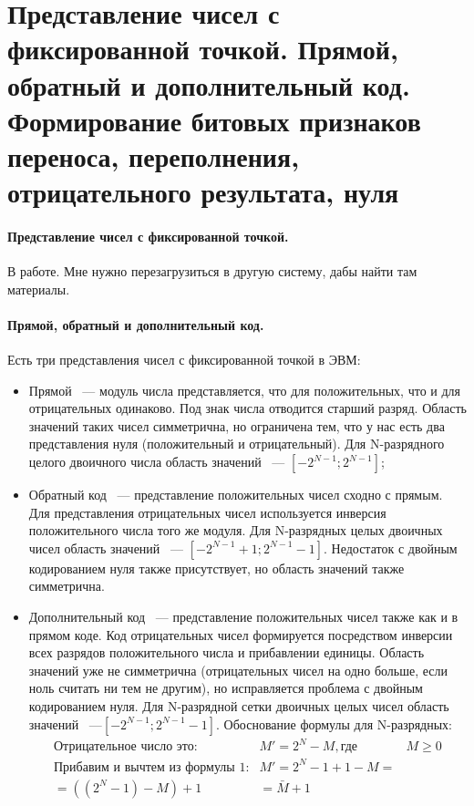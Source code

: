\documentclass[11pt]{article}
\begin{document}
	\section{Представление чисел с фиксированной точкой. Прямой, обратный и дополнительный код. Формирование битовых признаков переноса, переполнения, отрицательного результата, нуля}
	\paragraph{Представление чисел с фиксированной точкой.}
	В работе. Мне нужно перезагрузиться в другую систему, дабы найти там материалы.
	\paragraph{Прямой, обратный и дополнительный код.}
	Есть три представления чисел с фиксированной точкой в ЭВМ:
	\begin{itemize}
		\item Прямой ~--- модуль числа представляется, что для положительных, что и для отрицательных одинаково. Под знак числа отводится старший разряд. Область значений таких чисел симметрична, но ограничена тем, что у нас есть два представления нуля (положительный и отрицательный). Для N-разрядного целого двоичного числа область значений ~--- $[-2^{N-1}; 2^{N-1}]$;
		\item Обратный код ~--- представление положительных чисел сходно с прямым. Для представления отрицательных чисел используется инверсия положительного числа того же модуля. Для N-разрядных целых двоичных чисел область значений ~--- $[-2^{N-1}+1;2^{N-1}-1]$. Недостаток с двойным кодированием нуля также присутствует, но область значений также симметрична.
		\item Дополнительный код ~--- представление положительных чисел также как и в прямом коде. Код отрицательных чисел формируется посредством инверсии всех разрядов положительного числа и прибавлении единицы. Область значений уже не симметрична (отрицательных чисел на одно больше, если ноль считать ни тем не другим), но исправляется проблема с двойным кодированием нуля. Для N-разрядной сетки двоичных целых чисел область значений ~---$[-2^{N-1};2^{N-1}-1]$. Обоснование формулы для N-разрядных:
		\begin{align*}
			\text{Отрицательное число это:} & M' = 2^N - M,
			\text{где } & M\ge 0\\
			\text{Прибавим и вычтем из формулы 1:} & M' = 2^N - 1 + 1 - M =\\
			= ((2^N - 1) - M) + 1 &= \bar M + 1
		\end{align*}
	\end{itemize}
\end{document}
